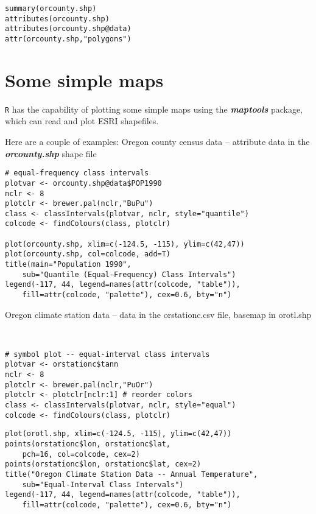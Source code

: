 \documentclass[12pt]{report}
\begin{document}
\begin{framed}
\begin{verbatim}
summary(orcounty.shp)
attributes(orcounty.shp)
attributes(orcounty.shp@data)
attr(orcounty.shp,"polygons")

\end{verbatim}
\end{framed}
\section{Some simple maps}
\texttt{R} has the capability of plotting some simple maps using the \textit{\textbf{maptools}} package, which can read and plot ESRI shapefiles.  

Here are a couple of examples:
Oregon county census data -- attribute data in the \textbf{\textit{orcounty.shp}} shape file
\begin{framed}
\begin{verbatim}
# equal-frequency class intervals
plotvar <- orcounty.shp@data$POP1990
nclr <- 8
plotclr <- brewer.pal(nclr,"BuPu")
class <- classIntervals(plotvar, nclr, style="quantile")
colcode <- findColours(class, plotclr)

plot(orcounty.shp, xlim=c(-124.5, -115), ylim=c(42,47))
plot(orcounty.shp, col=colcode, add=T)
title(main="Population 1990",
    sub="Quantile (Equal-Frequency) Class Intervals")
legend(-117, 44, legend=names(attr(colcode, "table")),
    fill=attr(colcode, "palette"), cex=0.6, bty="n")

\end{verbatim}
\end{framed}
Oregon climate station data -- data in the orstationc.csv file, basemap in orotl.shp
\begin{framed}
\begin{verbatim}


# symbol plot -- equal-interval class intervals
plotvar <- orstationc$tann
nclr <- 8
plotclr <- brewer.pal(nclr,"PuOr")
plotclr <- plotclr[nclr:1] # reorder colors
class <- classIntervals(plotvar, nclr, style="equal")
colcode <- findColours(class, plotclr)
\end{verbatim}
\end{framed}
\begin{framed}
\begin{verbatim}
plot(orotl.shp, xlim=c(-124.5, -115), ylim=c(42,47))
points(orstationc$lon, orstationc$lat, 
    pch=16, col=colcode, cex=2)
points(orstationc$lon, orstationc$lat, cex=2)
title("Oregon Climate Station Data -- Annual Temperature",
    sub="Equal-Interval Class Intervals")
legend(-117, 44, legend=names(attr(colcode, "table")),
    fill=attr(colcode, "palette"), cex=0.6, bty="n")

\end{verbatim}
\end{framed}
\end{document}
